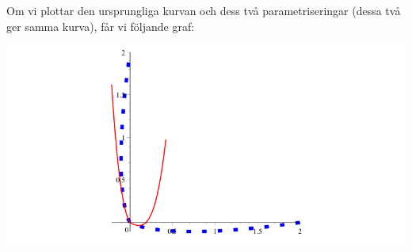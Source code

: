 \vspace{20pt}
Om vi plottar den ursprungliga kurvan och dess två parametriseringar (dessa två ger samma kurva), får vi följande graf:

\begin{center}
\includegraphics[scale=0.35]{Export/kurvorplot2d5.png}
\end{center}
